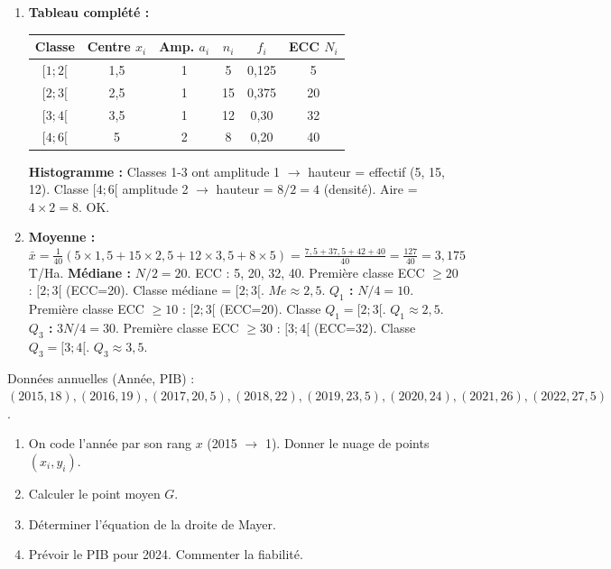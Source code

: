 \documentclass[11pt]{article}
\begin{document}
\begin{corrige}[Exercice 2]
\begin{enumerate}
    \item \textbf{Tableau complété :}
    \begin{center}
    \begin{tabular}{|c|c|c|c|c|c|}\hline
    \rowcolor{popblueL} Classe & Centre $x_i$ & Amp. $a_i$ & $n_i$ & $f_i$ & ECC $N_i$ \\ \hline
    $[1;2[$ & 1,5 & 1 & 5 & 0,125 & 5 \\
    $[2;3[$ & 2,5 & 1 & 15 & 0,375 & 20 \\
    $[3;4[$ & 3,5 & 1 & 12 & 0,30 & 32 \\
    $[4;6[$ & 5 & 2 & 8 & 0,20 & 40 \\ \hline
    \end{tabular}
    \end{center}
    \textbf{Histogramme :} Classes 1-3 ont amplitude 1 $\to$ hauteur = effectif (5, 15, 12). Classe $[4;6[$ amplitude 2 $\to$ hauteur = $8/2 = 4$ (densité). Aire = $4 \times 2 = 8$. OK.
    \item \textbf{Moyenne :} $\bar{x} = \frac{1}{40}(5\times1,5 + 15\times2,5 + 12\times3,5 + 8\times5) = \frac{7,5 + 37,5 + 42 + 40}{40} = \frac{127}{40} = 3,175$ T/Ha.
    \textbf{Médiane :} $N/2 = 20$. ECC : 5, 20, 32, 40. Première classe ECC $\ge 20$ : $[2;3[$ (ECC=20). Classe médiane = $[2;3[$. $Me \approx 2,5$.
    \textbf{$Q_1$ :} $N/4 = 10$. Première classe ECC $\ge 10$ : $[2;3[$ (ECC=20). Classe $Q_1 = [2;3[$. $Q_1 \approx 2,5$.
    \textbf{$Q_3$ :} $3N/4 = 30$. Première classe ECC $\ge 30$ : $[3;4[$ (ECC=32). Classe $Q_3 = [3;4[$. $Q_3 \approx 3,5$.
\end{enumerate}
\end{corrige}

\begin{exercice}
Données annuelles (Année, PIB) : $(2015, 18), (2016, 19), (2017, 20,5), (2018, 22), (2019, 23,5), (2020, 24), (2021, 26), (2022, 27,5)$.
\begin{enumerate}
    \item On code l'année par son rang $x$ (2015 $\to$ 1). Donner le nuage de points $(x_i, y_i)$.
    \item Calculer le point moyen $G$.
    \item Déterminer l'équation de la droite de Mayer.
    \item Prévoir le PIB pour 2024. Commenter la fiabilité.
\end{enumerate}
\end{exercice}
\end{document}
